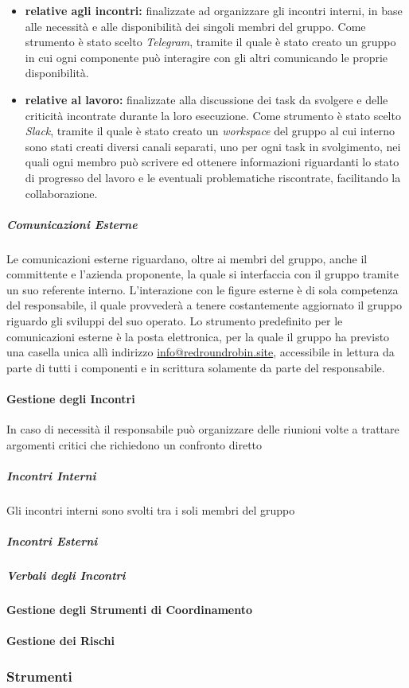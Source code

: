 				\begin{itemize}
					\item \textbf{relative agli incontri:} finalizzate ad organizzare gli incontri interni, in base alle necessità e alle disponibilità dei singoli membri del gruppo.\newline
					Come strumento è stato scelto \textit{Telegram}, tramite il quale è stato creato un gruppo in cui ogni componente può interagire con gli altri comunicando le proprie disponibilità.
					\item \textbf{relative al lavoro:} finalizzate alla discussione dei task da svolgere e delle criticità incontrate durante la loro esecuzione.\newline
					Come strumento è stato scelto \textit{Slack}, tramite il quale è stato creato un \textit{workspace} del gruppo al cui interno sono stati creati diversi canali separati, uno per ogni task in svolgimento, nei quali ogni membro può scrivere ed ottenere informazioni riguardanti lo stato di progresso del lavoro e le eventuali problematiche riscontrate, facilitando la collaborazione. 
				\end{itemize}
			
			\subparagraph{Comunicazioni Esterne}
			
				Le comunicazioni esterne riguardano, oltre ai membri del gruppo, anche il committente e l'azienda proponente, la quale si interfaccia con il gruppo tramite un suo referente interno. L'interazione con le figure esterne è di sola competenza del responsabile, il quale provvederà a tenere costantemente aggiornato il gruppo riguardo gli sviluppi del suo operato.\newline
				Lo strumento predefinito per le comunicazioni esterne è la posta elettronica, per la quale il gruppo ha previsto una casella unica allì indirizzo \href{mailto:info@redroundrobin.site}{info@redroundrobin.site}, accessibile in lettura da parte di tutti i componenti e in scrittura solamente da parte del responsabile.
						
		\paragraph{Gestione degli Incontri}
		
			In caso di necessità il responsabile può organizzare delle riunioni volte a trattare argomenti critici che richiedono un confronto diretto 
		
			\subparagraph{Incontri Interni}
			
				Gli incontri interni sono svolti tra i soli membri del gruppo 
			
			\subparagraph{Incontri Esterni}
			
			\subparagraph{Verbali degli Incontri}
		
		\paragraph{Gestione degli Strumenti di Coordinamento}
		
		\paragraph{Gestione dei Rischi}
	
	\subsubsection{Strumenti}